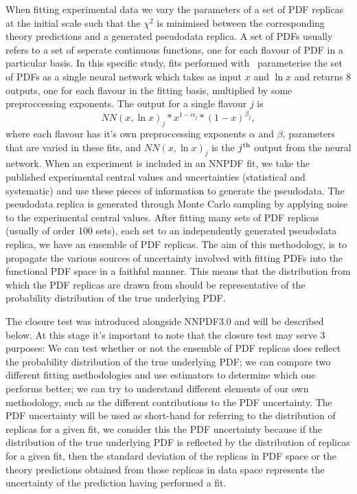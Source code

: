 When fitting experimental data we vary the parameters of a set of PDF replicas
at the initial scale such that the $\chi^2$ is minimised between the
corresponding theory predictions and a generated pseudodata replica. A set of
PDFs usually refers to a set of seperate continuous functions, one for each
flavour of PDF in a particular basis. In this specific study, fits performed
with \nfit\ parameterise the set of PDFs as a single neural network which takes
as input $x$ and $\ln x$ and returns 8 outputs, one for each flavour in the
fitting basis, multiplied by some preproccessing exponents. The output for a
single flavour $j$ is
\begin{equation}
    NN(x, \ln x)_j * x^{1-\alpha_j} * (1-x)^{\beta_j},
\end{equation}
where each flavour has it's own preproccessing exponents $\alpha$ and $\beta$,
parameters that are varied in these fits, and $NN(x, \ln x)_j$ is the
$j^{\rm th}$ output from the neural network.
When an experiment is included in an NNPDF fit, we take the published
experimental central values and uncertainties (statistical and systematic)
and use these pieces of information to generate the pseudodata.
The pseudodata replica is generated
through Monte Carlo sampling by applying noise to the experimental
central values.
After fitting many sets of PDF replicas (usually of order 100 sets),
each set to an independently generated pseudodata replica, we have an ensemble of
PDF replicas.
The aim of this methodology, is to propagate the various sources of
uncertainty involved with fitting PDFs into the functional PDF space in a faithful
manner. This means that the distribution from which the PDF replicas are drawn
from should be representative of the probability distribution of the true
underlying PDF.

The closure test was introduced alongside NNPDF3.0 and will be described below.
At this stage it's important to note that the closure test may serve 3 purposes:
We can test whether or not the ensemble of PDF replicas does reflect the
probability distribution of the true underlying PDF; we can compare two different
fitting methodologies and use estimators to determine which one performs better;
we can try to understand different elements of our own methodology, such as
the different contributions to the PDF uncertainty. The PDF uncertainty will
be used as short-hand for referring to the distribution of replicas for a given
fit, we consider this the PDF uncertainty because if the distribution
of the true underlying PDF is reflected by the distribution of replicas for
a given fit, then the standard deviation of the replicas in PDF space or the
theory predictions obtained from those replicas in data space represents
the uncertainty of the prediction having performed a fit.